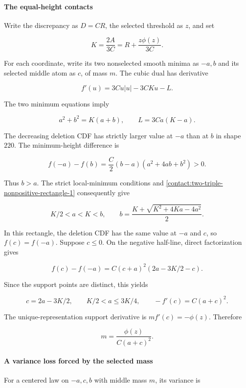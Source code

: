 \paragraph{The equal-height contacts}

Write the discrepancy as $D=C R$, the selected threshold as $z$, and set

\[
 K=\frac{2A}{3C}=R+\frac{z\phi(z)}{3C}.
\]

For each coordinate, write its two nonselected smooth minima as $-a,b$
and its selected middle atom as $c$, of mass $m$. The cubic dual has
derivative

\[
 f'(u)=3C u|u|-3CKu-L.
\]

The two minimum equations imply

\[
 a^2+b^2=K(a+b),\qquad L=3Ca(K-a).
\tag{B.7.1}\label{contact:two-triple-nonpositive-rectangle-1}
\]

The decreasing deletion CDF has strictly larger value at $-a$ than at
$b$ in shape $220$. The minimum-height difference is

\[
 f(-a)-f(b)=\frac{C}{2}(b-a)(a^2+4ab+b^2)>0.
\]

Thus $b>a$. The strict local-minimum conditions and \eqref{contact:two-triple-nonpositive-rectangle-1} consequently give

\[
 K/2<a<K<b,\qquad
 b=\frac{K+\sqrt{K^2+4Ka-4a^2}}2.
\tag{B.7.2}\label{contact:two-triple-nonpositive-rectangle-2}
\]

In this rectangle, the deletion CDF has the same value at $-a$ and $c$,
so $f(c)=f(-a)$. Suppose $c\le 0$. On the negative half-line, direct
factorization gives

\[
 f(c)-f(-a)=C(c+a)^2(2a-3K/2-c).
\]

Since the support points are distinct, this yields

\[
 c=2a-3K/2,\qquad K/2<a\leq3K/4,
 \qquad -f'(c)=C(a+c)^2.
\tag{B.7.3}\label{contact:two-triple-nonpositive-rectangle-3}
\]

The unique-representation support derivative is $m f'(c)=-\phi(z)$. Therefore

\[
 m=\frac{\phi(z)}{C(a+c)^2}.
\tag{B.7.4}\label{contact:two-triple-nonpositive-rectangle-4}
\]

\paragraph{A variance loss forced by the selected mass}

For a centered law on $-a,c,b$ with middle mass $m$, its variance is

